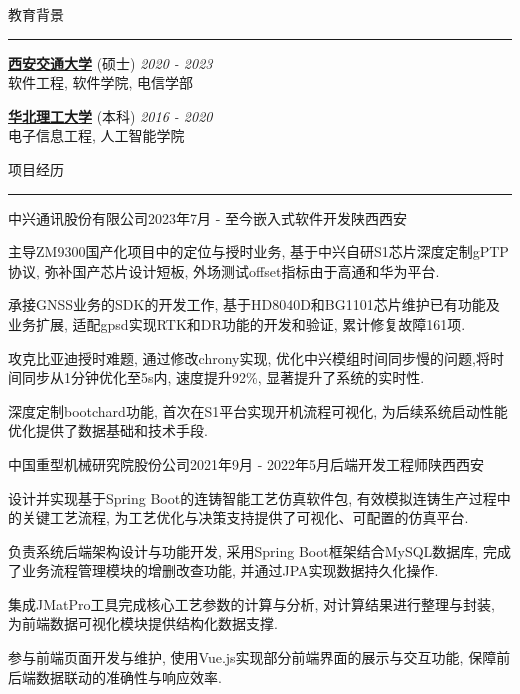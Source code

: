 \documentclass{cv} %
\renewenvironment{rSection}[1]{
\sectionskip
\textcolor{RoyalPurple}{\MakeUppercase{#1}}
\sectionlineskip
\hrule
\begin{list}{}{
\setlength{\leftmargin}{1.5em}
}
\item[]
}{
\end{list}
}
\begin{document}
\begin{rSection}{教育背景}

  {\bf \href{https://www.xjtu.edu.cn}{西安交通大学}} (硕士) \hfill {\em 2020 - 2023}
  \smallskip \\ 软件工程, 软件学院, 电信学部 \hfill

  {\bf \href{https://www.ncst.edu.cn}{华北理工大学}} (本科) \hfill {\em 2016 - 2020}
  \smallskip \\ 电子信息工程, 人工智能学院 \hfill

\end{rSection}

\begin{rSection}{项目经历}

  \begin{rSubsection}{中兴通讯股份有限公司}{2023年7月 - 至今}{嵌入式软件开发}{陕西西安}
    \item 主导ZM9300国产化项目中的定位与授时业务, 基于中兴自研S1芯片深度定制gPTP协议, 弥补国产芯片设计短板, 外场测试offset指标由于高通和华为平台.
    \item 承接GNSS业务的SDK的开发工作, 基于HD8040D和BG1101芯片维护已有功能及业务扩展, 适配gpsd实现RTK和DR功能的开发和验证, 累计修复故障161项.
    \item 攻克比亚迪授时难题, 通过修改chrony实现, 优化中兴模组时间同步慢的问题,将时间同步从1分钟优化至5s内, 速度提升92\%, 显著提升了系统的实时性.
    \item 深度定制bootchard功能, 首次在S1平台实现开机流程可视化, 为后续系统启动性能优化提供了数据基础和技术手段.
  \end{rSubsection}


  \begin{rSubsection}{中国重型机械研究院股份公司}{2021年9月 - 2022年5月}{后端开发工程师}{陕西西安}
    \item 设计并实现基于Spring Boot的连铸智能工艺仿真软件包, 有效模拟连铸生产过程中的关键工艺流程, 为工艺优化与决策支持提供了可视化、可配置的仿真平台.
    \item 负责系统后端架构设计与功能开发, 采用Spring Boot框架结合MySQL数据库, 完成了业务流程管理模块的增删改查功能, 并通过JPA实现数据持久化操作.
    \item 集成JMatPro工具完成核心工艺参数的计算与分析, 对计算结果进行整理与封装, 为前端数据可视化模块提供结构化数据支撑.
    \item 参与前端页面开发与维护, 使用Vue.js实现部分前端界面的展示与交互功能, 保障前后端数据联动的准确性与响应效率.
  \end{rSubsection}

\end{rSection}
\end{document}

